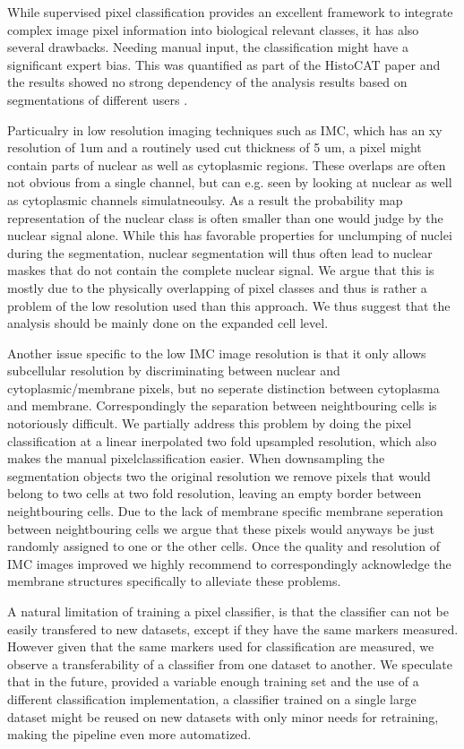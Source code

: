 \documentclass[a4paper]{article}
\begin{document}
While supervised pixel classification provides an excellent framework to integrate complex image
pixel information into biological relevant classes, it has also several drawbacks. Needing manual
input, the classification  might have a significant expert bias. This was quantified as part of the
HistoCAT paper and the results showed no strong dependency of the analysis results based on
segmentations of different users \cite{schapiro_histocat:_2017}.

Particualry in low resolution imaging techniques such as IMC, which has an xy resolution of 1um and
a routinely used cut thickness of 5 um, a pixel might contain parts of nuclear as well as
cytoplasmic regions. These overlaps are often not obvious from a single channel, but can e.g. seen
by looking at nuclear as well as cytoplasmic channels simulatneoulsy. As a result the probability
map representation of the nuclear class is often smaller than one would judge by the nuclear signal
alone. While this has favorable properties for unclumping of nuclei during the segmentation, nuclear
segmentation will thus often lead to nuclear maskes that do not contain
the complete nuclear signal. We argue that this is mostly due to the physically overlapping of
pixel classes and thus is rather a problem of the low resolution used than this approach. We thus
suggest that the analysis should be mainly done on the expanded cell level.

Another issue specific to the low IMC image resolution is that it only allows subcellular
resolution by discriminating
between nuclear and cytoplasmic/membrane pixels, but no seperate distinction between cytoplasma and
membrane. Correspondingly the separation between neightbouring cells is notoriously difficult. We
partially address this problem by doing the pixel classification at a linear inerpolated two fold
upsampled resolution, which also makes the manual pixelclassification easier. When downsampling the
segmentation objects two the original resolution we remove pixels that would belong to two cells at
two fold resolution, leaving an empty border between neightbouring cells. Due to the lack of
membrane specific membrane seperation between neightbouring cells we argue that these pixels would
anyways be just randomly assigned to one or the other cells. Once the quality and resolution of IMC
images improved we highly recommend to correspondingly acknowledge the membrane structures
specifically to alleviate these problems.

A natural limitation of training a pixel classifier, is that the classifier can not be easily
transfered to new datasets, except if they have the same markers measured. However given that the
same markers used for classification are measured, we observe a transferability of a classifier
from one dataset to another. We speculate that in the future, provided a variable enough training
set and the use of a different classification implementation, a classifier trained on a single large dataset might be reused on new datasets with only minor
needs for retraining, making the pipeline even more automatized.
\end{document}
